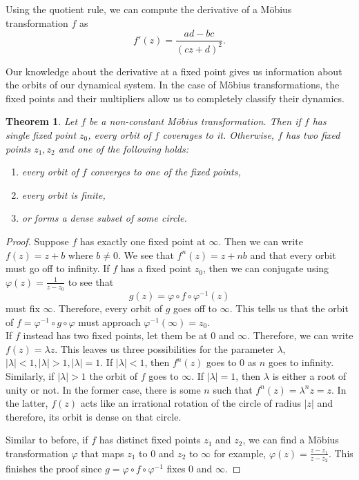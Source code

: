 \documentclass{amsart}
\newcommand{\abs}[1]{ \left| #1 \right| }
\renewcommand{\phi}{\varphi}
\newtheorem{thm}{Theorem}[section]
\theoremstyle{definition}
\theoremstyle{remark}
\numberwithin{equation}{section}
\begin{document}
Using the quotient rule, we can compute the derivative of a M\"obius transformation $f$ as
\begin{equation}
  f'(z)=\frac{ad-bc}{(cz+d)^2}.
\end{equation}

Our knowledge about the derivative at a fixed point gives us information about the orbits of our dynamical system.  In the case of M\"obius transformations, the fixed points and their multipliers allow us to completely classify their dynamics.

\begin{thm}
  Let $f$ be a non-constant M\"obius transformation. Then if $f$ has single fixed point $z_0$, every orbit of $f$ coverages to it. Otherwise, $f$ has two fixed points $z_1, z_2$  and one of the following holds:
  \begin{enumerate}
    \item every orbit of $f$ converges to one of the fixed points,
    \item every orbit is finite,
    \item or forms a dense subset of some circle.
  \end{enumerate}

\end{thm}

\begin{proof}
Suppose $f$ has exactly one fixed point at $\infty$. Then we can write $f(z)=z+b$ where $b\neq0$. We see that $f^n(z)=z+nb$ and that every orbit must go off to infinity. If $f$ has a fixed point $z_0$, then we can conjugate using $\phi(z)=\frac{1}{z-z_0}$ to see that
\[
g(z)=\phi\circ f\circ\phi^{-1}(z)
\]
must fix $\infty$. Therefore, every orbit of $g$ goes off to $\infty$. This tells us that the orbit of $f=\phi^{-1}\circ g\circ \phi$ must approach $\phi^{-1}(\infty)=z_0$.\\

If $f$ instead has two fixed points, let them be at $0$ and $\infty$. Therefore, we can write $f(z)=\lambda z$. This leaves us three possibilities for the parameter $\lambda$, $\abs{\lambda}<1, \abs{\lambda}>1, \abs{\lambda}=1$. If $\abs{\lambda}<1$, then $f^n(z)$ goes to 0 as $n$ goes to infinity. Similarly, if $\abs{\lambda}>1$ the orbit of $f$ goes to $\infty$. If $\abs{\lambda}=1$, then $\lambda$ is either a root of unity or not. In the former case, there is some $n$ such that $f^n(z)=\lambda^n z=z$. In the latter, $f(z)$ acts like an irrational rotation of the circle of radius $\abs{z}$ and therefore, its orbit is dense on that circle.

Similar to before, if $f$ has distinct fixed points $z_1$ and $z_2$, we can find a M\"obius transformation $\phi$ that maps $z_1$ to 0 and $z_2$ to $\infty$ for example, $\phi(z)=\frac{z-z_1}{z-z_2}$. This finishes the proof since $g=\phi\circ f\circ\phi^{-1}$ fixes 0 and $\infty$.
 \end{proof}
\end{document}
